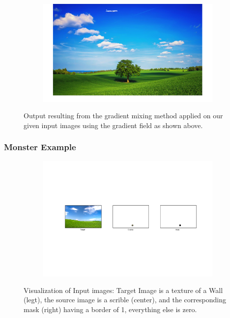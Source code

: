 \documentclass{paper}
\begin{document}
\begin{figure}[H]
    \centering
    \begin{subfigure}{1.0\textwidth}
        \includegraphics[width=\textwidth]{../../outputs/p4/seamless_cloning/plane/output}
    \end{subfigure}
    \caption{Output resulting from the gradient mixing method applied on our given input images using the gradient field as shown above.}
    \label{fig:gradient_mixing_out}       
\end{figure}

\subsubsection{Monster Example}
\begin{figure}[H]
    \centering
    \begin{subfigure}{1.0\textwidth}
        \includegraphics[width=\textwidth]{../../outputs/p4/seamless_cloning/monster/input}
    \end{subfigure}
    \caption{Visualization of Input images: Target Image is a texture of a Wall (legt), the source image is a scrible (center), and the corresponding mask (right) having a border of 1, everything else is zero.}
    \label{fig:gradient_mixing_input}       
\end{figure}
\end{document}
